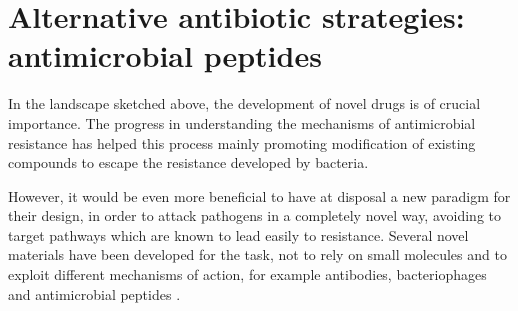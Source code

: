 %
%


\section{Alternative antibiotic strategies: antimicrobial peptides}
In the landscape sketched above, the development of novel drugs is of crucial importance. The progress in understanding the mechanisms of antimicrobial resistance has helped this process mainly promoting modification of existing compounds to escape the resistance developed by bacteria.

However, it would be even more beneficial to have at disposal a new paradigm for their design, in order to attack pathogens in a completely novel way, avoiding to target pathways which are known to lead easily to resistance. Several novel materials have been developed for the task, not to rely on small molecules and to exploit different mechanisms of action, for example antibodies, bacteriophages and antimicrobial peptides \citep{Mantravadi2019}.

